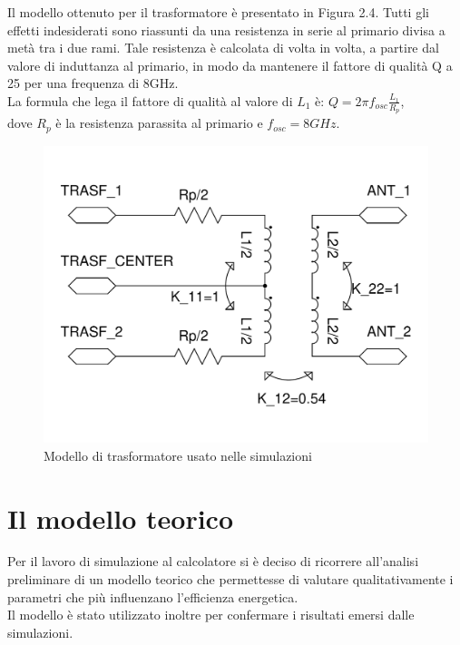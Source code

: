 \documentclass[a4paper, 12pt]{memoir}
\begin{document}
Il modello ottenuto per il trasformatore è presentato in Figura 2.4.
Tutti gli effetti indesiderati sono riassunti da una resistenza in serie al
primario divisa a metà tra i due rami. Tale resistenza è calcolata di volta in
volta, a partire dal valore di induttanza al primario, in modo da mantenere il
fattore di qualità Q a 25 per una frequenza di 8GHz.\\
La formula che lega il fattore di qualità al valore di $L_1$ è:
$ Q = 2\pi f_{osc} \frac{L_1}{R_p} $,\\
dove $R_p$ è la resistenza parassita al primario e $ f_{osc}=8GHz $.
\begin{figure}[h]
\centering
\includegraphics[height=0.34\textheight]{images/trasf_model.pdf}
\caption{Modello di trasformatore usato nelle simulazioni}
\end{figure}
\clearpage %

\section{Il modello teorico}
Per il lavoro di simulazione al calcolatore si è deciso di ricorrere 
all'analisi preliminare di un modello teorico che permettesse di valutare
qualitativamente i parametri che più influenzano l'efficienza energetica.\\
Il modello è stato utilizzato inoltre per confermare i risultati emersi dalle
simulazioni.
\end{document}
